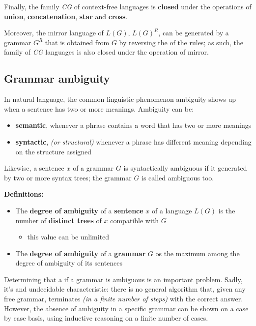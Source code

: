 \documentclass[english]{article}
\begin{document}
Finally, the family \textit{CG} of context-free languages is \textbf{closed} under the operations of \textbf{union}, \textbf{concatenation}, \textbf{star} and \textbf{cross}.

Moreover, the mirror language of \(L(G)\), \(L(G)^R\), can be generated by a grammar \(G^R\) that is obtained from \(G\) by reversing the \RP of the rules; as such, the family of \textit{CG} languages is also closed under the operation of mirror.

\subsection{Grammar ambiguity}
\label{sec:grammar-ambiguity}

In natural language, the common linguistic phenomenon ambiguity shows up when a sentence has two or more meanings.
Ambiguity can be:

\begin{itemize}
  \item \textbf{semantic}, whenever a phrase contains a word that has two or more meanings
  \item \textbf{syntactic}, \textit{(or structural)} whenever a phrase has different meaning depending on the structure assigned
\end{itemize}

Likewise, a sentence \(x\) of a grammar \(G\) is syntactically ambiguous if it generated by two or more syntax trees;
the grammar \(G\) is called ambiguous too.

\bigskip
\textbf{Definitions:}

\begin{itemize}
  \item The \textbf{degree of ambiguity} of a \textbf{sentence} \(x\) of a language \(L(G)\) is the number of \textbf{distinct trees} of \(x\) compatible with \(G\)
        \begin{itemize}
          \item this value can be unlimited
        \end{itemize}
  \item The \textbf{degree of ambiguity} of a \textbf{grammar} \(G\) os the maximum among the degree of ambiguity of its sentences
\end{itemize}

\bigskip
Determining that a if a grammar is ambiguous is an important problem.
Sadly, it's and undecidable characteristic: there is no general algorithm that, given any free grammar, terminates \textit{(in a finite number of steps)} with the correct answer.
However, the absence of ambiguity in a specific grammar can be shown on a case by case basis, using inductive reasoning on a finite number of cases.
\end{document}
